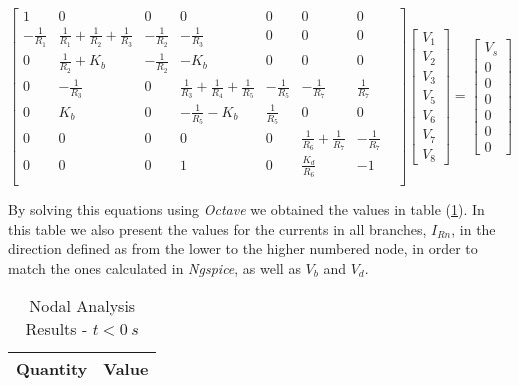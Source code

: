 \begin{equation}
  \begin{bmatrix}
    1 & 0 & 0 & 0 & 0 & 0 & 0\\
    -\frac{1}{R_1} & \frac{1}{R_1} + \frac{1}{R_2} + \frac{1}{R_3} & - \frac{1}{R_2} & - \frac{1}{R_3} & 0 & 0 & 0\\
    0 & \frac{1}{R_2} + K_b & - \frac{1}{R_2} & - K_b & 0 & 0 & 0\\
    0 & - \frac{1}{R_3} & 0 & \frac{1}{R_3} + \frac{1}{R_4} + \frac{1}{R_5} & - \frac{1}{R_5} & - \frac{1}{R_7} & \frac{1}{R_7}\\
    0 & K_b & 0 & - \frac{1}{R_5} - K_b & \frac{1}{R_5} & 0 & 0\\
    0 & 0 & 0 & 0 & 0 & \frac{1}{R_6} + \frac{1}{R_7}  & - \frac{1}{R_7} &\\ 
    0 & 0 & 0 & 1 & 0 & \frac{K_d}{R_6} & -1\\
  \end{bmatrix}
  \begin{bmatrix}
    V_1\\
    V_2\\
    V_3\\
    V_5\\
    V_6\\
    V_7\\
    V_8
  \end{bmatrix}
  =
  \begin{bmatrix}
    V_s\\
    0\\
    0\\
    0\\
    0\\
    0\\
    0
  \end{bmatrix}
\end{equation}

By solving this equations using \emph{Octave} we obtained the values in table (\ref{tab:Teo1}).
In this table we also present the values for the currents in all branches, $I_{Rn}$, in the direction
defined as from the lower to the higher numbered node, in order to match the ones calculated in 
\emph{Ngspice}, as well as $V_b$ and $V_d$.

\begin{table}[H]
    \centering
    \begin{tabular}{|l|r|}
    \hline    
    {\bf Quantity} & {\bf Value} \\ \hline
    
    \end{tabular}
    \caption{Nodal Analysis Results - $t < 0 \:s$}
    \label{tab:Teo1}
\end{table} 




